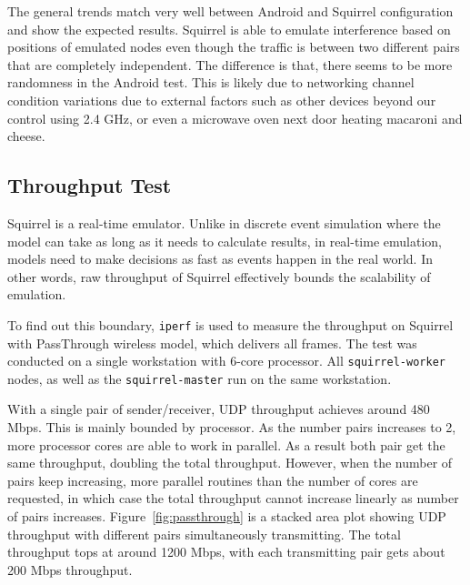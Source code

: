 \documentclass[12pt]{report}
\begin{document}
The general trends match very well between Android and Squirrel configuration and show the expected results. Squirrel is able to emulate interference based on positions of emulated nodes even though the traffic is between two different pairs that are completely independent. The difference is that, there seems to be more randomness in the Android test. This is likely due to networking channel condition variations due to external factors such as other devices beyond our control using 2.4 GHz, or even a microwave oven next door heating macaroni and cheese.

\subsection{Throughput Test}

Squirrel is a real-time emulator. Unlike in discrete event simulation where the model can take as long as it needs to calculate results, in real-time emulation, models need to make decisions as fast as events happen in the real world. In other words, raw throughput of Squirrel effectively bounds the scalability of emulation.

To find out this boundary, \texttt{iperf} is used to measure the throughput on Squirrel with PassThrough wireless model, which delivers all frames. The test was conducted on a single workstation with 6-core processor. All \texttt{squirrel-worker} nodes, as well as the \texttt{squirrel-master} run on the same workstation.

With a single pair of sender/receiver, UDP throughput achieves around 480 Mbps. This is mainly bounded by processor. As the number pairs increases to 2, more processor cores are able to work in parallel. As a result both pair get the same throughput, doubling the total throughput. However, when the number of pairs keep increasing, more parallel routines than the number of cores are requested, in which case the total throughput cannot increase linearly as number of pairs increases. Figure~\ref{fig:passthrough} is a stacked area plot showing UDP throughput with different pairs simultaneously transmitting. The total throughput tops at around 1200 Mbps, with each transmitting pair gets about 200 Mbps throughput.
\end{document}
